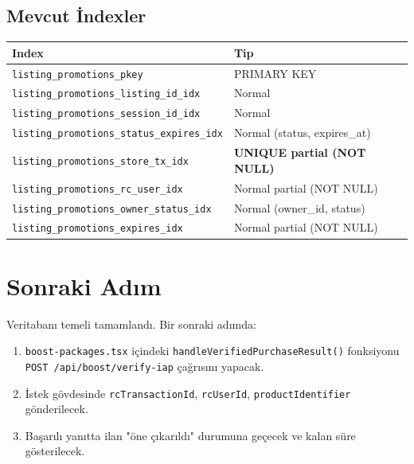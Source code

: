 \documentclass[12pt,a4paper]{article}
\begin{document}
\subsection{Mevcut İndexler}

\begin{center}
\begin{tabular}{ll}
  \toprule
  \textbf{Index} & \textbf{Tip}\\
  \midrule
  \texttt{listing\_promotions\_pkey}              & PRIMARY KEY\\
  \texttt{listing\_promotions\_listing\_id\_idx}  & Normal\\
  \texttt{listing\_promotions\_session\_id\_idx}  & Normal\\
  \texttt{listing\_promotions\_status\_expires\_idx} & Normal (status, expires\_at)\\
  \texttt{listing\_promotions\_store\_tx\_idx}    & \textbf{UNIQUE partial (NOT NULL)}\\
  \texttt{listing\_promotions\_rc\_user\_idx}     & Normal partial (NOT NULL)\\
  \texttt{listing\_promotions\_owner\_status\_idx} & Normal (owner\_id, status)\\
  \texttt{listing\_promotions\_expires\_idx}      & Normal partial (NOT NULL)\\
  \bottomrule
\end{tabular}
\end{center}

\section{Sonraki Adım}

Veritabanı temeli tamamlandı. Bir sonraki adımda:

\begin{enumerate}[leftmargin=1.5em]
  \item \texttt{boost-packages.tsx} içindeki \texttt{handleVerifiedPurchaseResult()}
        fonksiyonu \texttt{POST /api/boost/verify-iap} çağrısını yapacak.
  \item İstek gövdesinde \texttt{rcTransactionId}, \texttt{rcUserId},
        \texttt{productIdentifier} gönderilecek.
  \item Başarılı yanıtta ilan "öne çıkarıldı" durumuna geçecek ve
        kalan süre gösterilecek.
\end{enumerate}
\end{document}
